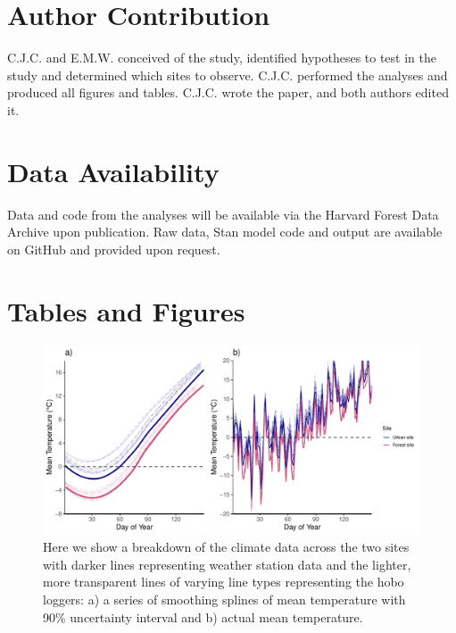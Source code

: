 \documentclass{article}\usepackage[]{graphicx}\usepackage[]{color}
\begin{document}
\section*{Author Contribution} 
C.J.C. and E.M.W. conceived of the study, identified hypotheses to test in the study and determined which sites to observe. C.J.C. performed the analyses and produced all figures and tables. C.J.C. wrote the paper, and both authors edited it.

\section*{Data Availability}
Data and code from the analyses will be available via the Harvard Forest Data Archive upon publication. Raw data, {Stan} model code and output are available on GitHub and provided upon request.




\section*{Tables and Figures}

{\begin{figure} [H]
  \begin{center}
  \includegraphics[width=16cm]{..//analyses/figures/climate_smoothdaily.pdf}
  \caption{Here we show a breakdown of the climate data across the two sites with darker lines representing weather station data and the lighter, more transparent lines of varying line types representing the hobo loggers: a) a series of smoothing splines of mean temperature with 90\% uncertainty interval and b) actual mean temperature.}\label{fig:clim}
  \end{center}
  \end{figure}}
  
\end{document}
